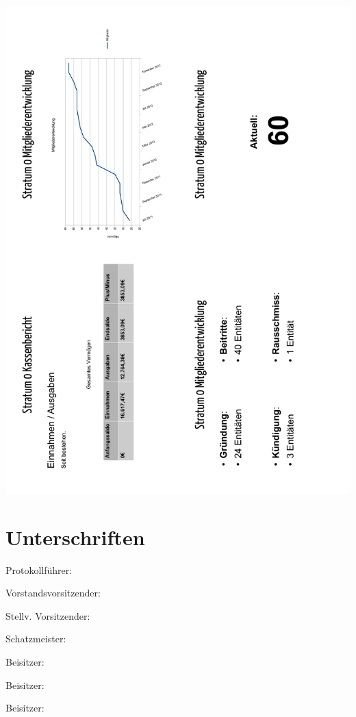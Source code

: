 \documentclass[a4paper,12pt]{scrartcl}
\begin{document}
\includegraphics[width=\textwidth]{images/Kassenbericht_2012_2.pdf}

\section{Unterschriften}
\vspace{0.7cm}
\noindent Protokollführer: \hrulefill\hfill\phantom{c}\par
\vspace{0.7cm}
\noindent Vorstandsvorsitzender: \hrulefill\hfill\phantom{c}\par
\vspace{0.7cm}
\noindent Stellv. Vorsitzender: \hrulefill\hfill\phantom{c}\par
\vspace{0.7cm}
\noindent Schatzmeister: \hrulefill\hfill\phantom{c}\par
\vspace{0.7cm}
\noindent Beisitzer: \hrulefill\hfill\phantom{c}\par
\vspace{0.7cm}
\noindent Beisitzer: \hrulefill\hfill\phantom{c}\par
\vspace{0.7cm}
\noindent Beisitzer: \hrulefill\hfill\phantom{c}\par
\end{document}
